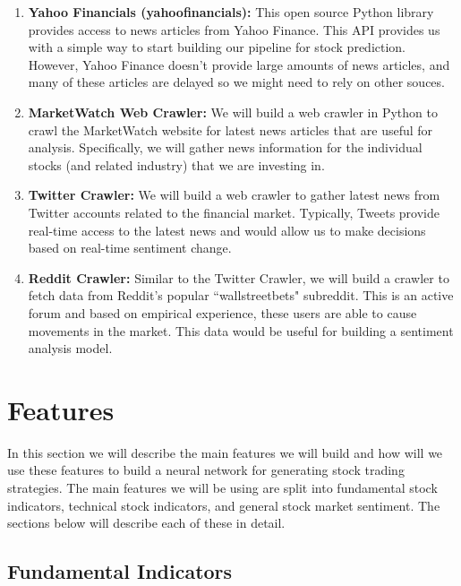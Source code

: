 \documentclass[10pt]{article}
\begin{document}
\begin{enumerate}

\item \textbf{Yahoo Financials (yahoofinancials):} This open source Python library provides access to news articles from Yahoo Finance. This API provides us with a simple way to start building our pipeline for stock prediction. However, Yahoo Finance doesn't provide large amounts of news articles, and many of these articles are delayed so we might need to rely on other souces.

\item \textbf{MarketWatch Web Crawler:} We will build a web crawler in Python to crawl the MarketWatch website for latest news articles that are useful for analysis. Specifically, we will gather news information for the individual stocks (and related industry) that we are investing in.

\item \textbf{Twitter Crawler:} We will build a web crawler to gather latest news from Twitter accounts related to the financial market. Typically, Tweets provide real-time access to the latest news and would allow us to make decisions based on real-time sentiment change.

\item \textbf{Reddit Crawler:} Similar to the Twitter Crawler, we will build a crawler to fetch data from Reddit's popular ``wallstreetbets" subreddit. This is an active forum and based on empirical experience, these users are able to cause movements in the market. This data would be useful for building a sentiment analysis model.

\end{enumerate}


\section{Features}

In this section we will describe the main features we will build and how will we use these features to build a neural network for generating stock trading strategies. The main features we will be using are split into fundamental stock indicators, technical stock indicators, and general stock market sentiment. The sections below will describe each of these in detail.

\subsection{Fundamental Indicators}
\end{document}
